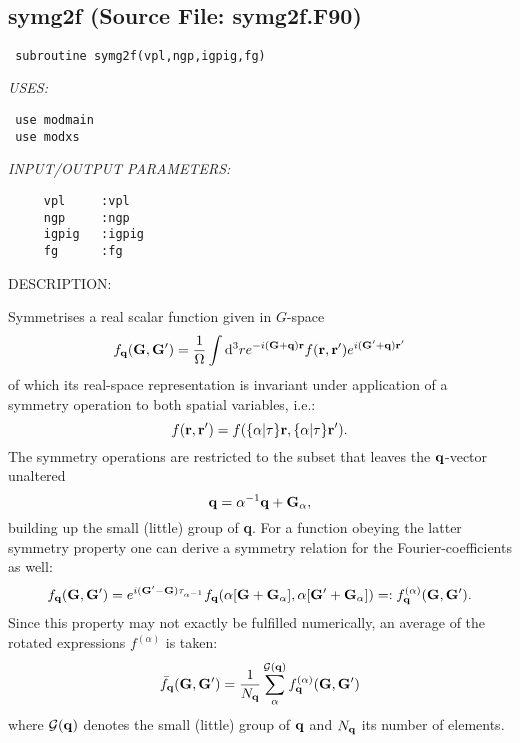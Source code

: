 \documentclass[11pt]{article}
\begin{document}











 
 
\mbox{}\hrulefill\ 
 
\subsection{symg2f (Source File: symg2f.F90)}


\begin{verbatim} subroutine symg2f(vpl,ngp,igpig,fg)\end{verbatim}{\em USES:}
\begin{verbatim} use modmain
 use modxs
 \end{verbatim}{\em INPUT/OUTPUT PARAMETERS:}
\begin{verbatim}     vpl     :vpl
     ngp     :ngp
     igpig   :igpig
     fg      :fg\end{verbatim}
{\sf DESCRIPTION:\\ }


     Symmetrises a real scalar function given in $G$-space
     $$ f_{\bf q}({\bf G},{\bf G'}) = \frac{1}{\Omega}\int {\rm d}^3r 
     e^{-i{\bf (G+q)r}} f({\bf r},{\bf r'}) e^{i{\bf (G'}+{\bf q}){\bf r'}} $$
     of which its real-space representation is invariant under application of
     a symmetry  operation to both spatial variables, i.e.:
     $$ f({\bf r},{\bf r'}) = f(\{\alpha|\tau\}{\bf r},\{\alpha|\tau\}{\bf r'}).
     $$
     The symmetry operations are restricted to the subset that leaves the
     ${\bf q}$-vector unaltered
     $$ {\bf q}=\alpha^{-1}{\bf q} + {\bf G}_{\alpha},  $$
     building up the small (little) group of {\bf q}.
     For a function obeying the latter symmetry property one can derive a
     symmetry relation for the Fourier-coefficients as well:
     $$ f_{\bf q}({\bf G},{\bf G'}) =  
     e^{i({\bf G'}-{\bf G})\tau_{\alpha^{-1}}} 
     f_{\bf q}(\alpha[{\bf G}+{\bf G}_{\alpha}],
     \alpha[{\bf G'}+{\bf G}_{\alpha}]) =: f^{(\alpha)}_{\bf q}({\bf G},
     {\bf G'}).$$
     Since this property may not exactly be fulfilled numerically, an average
     of the rotated expressions $f^{(\alpha)}$ is taken:
     $$  \bar{f}_{\bf q}({\bf G},{\bf G'})= \frac{1}{N_{\bf q}}
     \sum_{\alpha}^{\mathcal{G}({\bf q})}
     f^{(\alpha)}_{\bf q}({\bf G},{\bf G'}) $$
     where $\mathcal{G}({\bf q})$ denotes the small (little) group of ${\bf q}$
     and $N_{\bf q}$ its number of elements.
  
\end{document}
